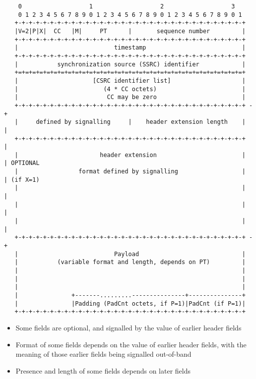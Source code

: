 \documentclass[10pt,a4paper]{article}
\begin{document}
\footnotesize
\begin{verbatim}
    0                   1                   2                   3
    0 1 2 3 4 5 6 7 8 9 0 1 2 3 4 5 6 7 8 9 0 1 2 3 4 5 6 7 8 9 0 1
   +-+-+-+-+-+-+-+-+-+-+-+-+-+-+-+-+-+-+-+-+-+-+-+-+-+-+-+-+-+-+-+-+
   |V=2|P|X|  CC   |M|     PT      |       sequence number         |
   +-+-+-+-+-+-+-+-+-+-+-+-+-+-+-+-+-+-+-+-+-+-+-+-+-+-+-+-+-+-+-+-+
   |                           timestamp                           |
   +-+-+-+-+-+-+-+-+-+-+-+-+-+-+-+-+-+-+-+-+-+-+-+-+-+-+-+-+-+-+-+-+
   |           synchronization source (SSRC) identifier            |
   +=+=+=+=+=+=+=+=+=+=+=+=+=+=+=+=+=+=+=+=+=+=+=+=+=+=+=+=+=+=+=+=+
   |                     [CSRC identifier list]                    |
   |                        (4 * CC octets)                        |
   |                         CC may be zero                        |
   +-+-+-+-+-+-+-+-+-+-+-+-+-+-+-+-+-+-+-+-+-+-+-+-+-+-+-+-+-+-+-+-+ -+
   |     defined by signalling     |    header extension length    |  |
   +-+-+-+-+-+-+-+-+-+-+-+-+-+-+-+-+-+-+-+-+-+-+-+-+-+-+-+-+-+-+-+-+  |
   |                       header extension                        |  | OPTIONAL
   |                 format defined by signalling                  |  | (if X=1)
   |                                                               |  |
   |                                                               |  |
   |                                                               |  |
   +-+-+-+-+-+-+-+-+-+-+-+-+-+-+-+-+-+-+-+-+-+-+-+-+-+-+-+-+-+-+-+-+ -+
   |                           Payload                             |
   |           (variable format and length, depends on PT)         |
   |                                                               |
   |                                                               |
   |                                                               |
   |               +-------.........---------------+---------------+
   |               |Padding (PadCnt octets, if P=1)|PadCnt (if P=1)|
   +-+-+-+-+-+-+-+-+-+-+-+-+-+-+-+-+-+-+-+-+-+-+-+-+-+-+-+-+-+-+-+-+
\end{verbatim}
\normalsize

\begin{itemize}
  \item Some fields are optional, and signalled by the value of earlier 
        header fields
  \item Format of some fields depends on the value of earlier header fields,
        with the meaning of those earlier fields being signalled out-of-band
  \item Presence and length of some fields depends on later fields
\end{itemize}
\end{document}
